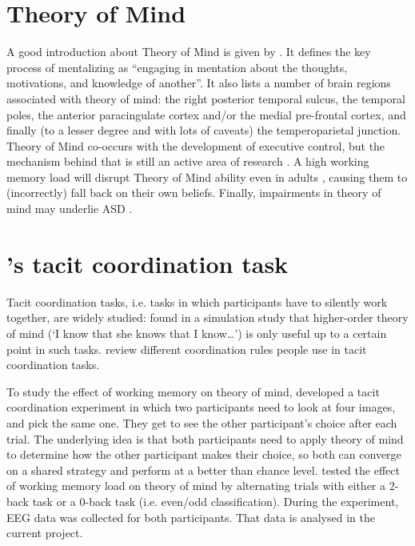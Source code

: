
\appendix
\section{Theory of Mind}
\label{app:tom}

A good introduction about Theory of Mind is given by
\textcite[p.~455--467]{postle_essentials_2020}. It defines the key process of
mentalizing as ``engaging in mentation about the thoughts, motivations,
and knowledge of another''. It also lists a number of brain regions associated
with theory of mind: the right posterior temporal sulcus, the temporal poles,
the anterior paracingulate cortex and/or the medial pre-frontal cortex, and
finally (to a lesser degree and with lots of caveats) the temperoparietal
junction. Theory of Mind co-occurs with the development of executive control,
but the mechanism behind that is still an active area of research
\parencite{perner_development_1999,bradford_self_2015}. A high working memory
load will disrupt Theory of Mind ability even in adults
\parencite{maehara_i_2011}, causing them to (incorrectly) fall back on their
own beliefs. Finally, impairments in theory of mind may underlie ASD
\parencite[p.~457]{baron-cohen_does_1985,frith_theory_2005,postle_essentials_2020}.

\section{\citeauthor{newman_effects_2021}'s tacit coordination task}
\label{app:task}

Tacit coordination tasks, i.e. tasks in which participants have to silently work
together, are widely studied: \textcite{de_weerd_higher-order_2015} found
in a simulation study that higher-order theory of mind (`I know that she knows
that I know\ldots') is only useful up to a certain point in such tasks.
\Textcite{de_kwaadsteniet_social-psychological_2012} review different
coordination rules people use in tacit coordination tasks.

To study the effect of working memory on theory of mind,
\textcite{newman_effects_2021} developed a tacit coordination experiment in
which two participants need to look at four images, and pick the same one.
They get to see the other participant's choice after each trial. The
underlying idea is that both participants need to apply theory of mind to
determine how the other participant makes their choice, so both can converge on
a shared strategy and perform at a better than chance level.
\textcite{newman_effects_2021} tested the effect of working memory load on
theory of mind by alternating trials with either a 2-back task
\parencite{kirchner_age_1958} or a 0-back task (i.e. even/odd classification).
During the experiment, EEG data was collected for both participants. That data
is analysed in the current project.

